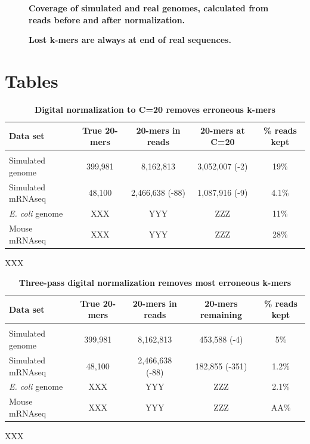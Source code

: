 \documentclass[10pt,draft]{article}
\begin{document}
\begin{figure}
\caption{
{\bf Coverage of simulated and real genomes, calculated from reads before and after normalization.}}
\label{fig:coverage}
\end{figure}

\begin{figure}
\caption{
{\bf Lost k-mers are always at end of real sequences.}}
\label{fig:supplEnd}
\end{figure}

\section*{Tables}

\begin{table}[!ht]
\caption{
\bf{Digital normalization to C=20 removes erroneous k-mers}}
\begin{tabular}{|l|c|c|c|c|}
Data set & True 20-mers & 20-mers in reads & 20-mers at C=20 & \% reads kept\\
\hline \\
Simulated genome & 399,981 & 8,162,813 & 3,052,007 (-2) & 19\% \\
Simulated mRNAseq & 48,100 & 2,466,638 (-88) & 1,087,916 (-9) & 4.1\% \\
{\em E. coli} genome & XXX & YYY & ZZZ & 11\% \\
Mouse mRNAseq & XXX & YYY & ZZZ & 28\% \\
\end{tabular}
\begin{flushleft} XXX
\end{flushleft}
\label{tab:normC20}
\end{table}

\begin{table}[!ht]
\caption{
\bf{Three-pass digital normalization removes most erroneous k-mers}}
\begin{tabular}{|l|c|c|c|c|}
Data set & True 20-mers & 20-mers in reads & 20-mers remaining & \% reads kept\\
\hline \\
Simulated genome & 399,981 & 8,162,813 & 453,588 (-4) & 5\% \\
Simulated mRNAseq & 48,100 & 2,466,638 (-88) & 182,855 (-351) & 1.2\% \\
{\em E. coli} genome & XXX & YYY & ZZZ & 2.1\% \\
Mouse mRNAseq & XXX & YYY & ZZZ & AA\% \\
\end{tabular}
\begin{flushleft} XXX
\end{flushleft}
\label{tab:normC5}
\end{table}
\end{document}
